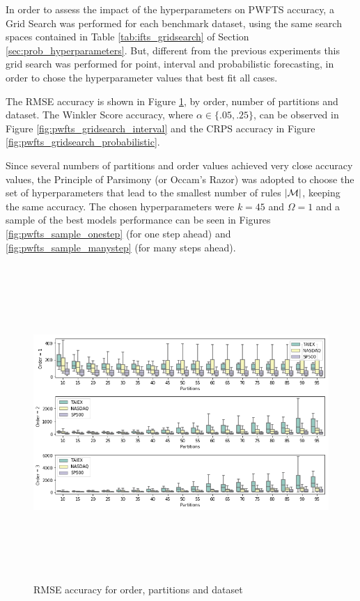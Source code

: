 In order to assess the impact of the hyperparameters on PWFTS accuracy, a Grid Search was performed for each benchmark dataset, using the same search spaces contained in Table \ref{tab:ifts_gridsearch} of Section \ref{sec:prob_hyperparameters}. But, different from the previous experiments this grid search was performed for point, interval and probabilistic forecasting, in order to chose the hyperparameter values that best fit all cases.

The RMSE accuracy is shown in Figure \ref{fig:pwfts_gridsearch_point}, by order, number of partitions and dataset. The Winkler Score accuracy, where  $\alpha \in \{.05,.25\}$, can be observed in Figure \ref{fig:pwfts_gridsearch_interval} and the CRPS accuracy in Figure \ref{fig:pwfts_gridsearch_probabilistic}.

Since several numbers of partitions and order values achieved very close accuracy values, the Principle of Parsimony (or Occam's Razor) was adopted to choose the set of hyperparameters that lead to the smallest number of rules $|\mathcal{M}|$, keeping the same accuracy. The chosen hyperparameters were $k = 45$ and $\Omega = 1$ and a sample of the best models performance can be seen in Figures \ref{fig:pwfts_sample_onestep} (for one step ahead) and \ref{fig:pwfts_sample_manystep} (for many steps ahead).


\begin{figure}[htb]
    \centering
    \includegraphics[width=\textwidth,height=12cm]{figures/pwfts_gridsearch_point.png}
    \caption{RMSE accuracy for order, partitions and dataset}
    \label{fig:pwfts_gridsearch_point}
\end{figure}

